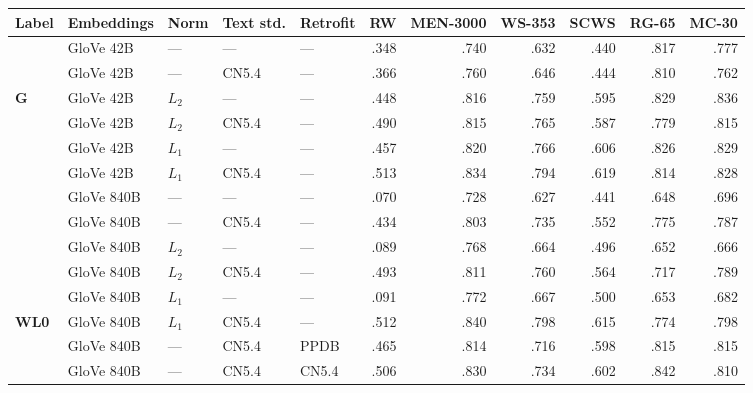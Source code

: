 \documentclass[letterpaper]{article}
\begin{document}
\begin{table*}[t]
\centering
\begin{tabular}{lllllrrrrrr}
\toprule
Label  &Embeddings   & Norm  & Text std. & Retrofit &       RW & MEN-3000 &    WS-353 &      SCWS &    RG-65 &    MC-30 \\
\midrule
       &GloVe 42B    & ---   & ---       & ---      &     .348 &     .740 &      .632 &      .440 &     .817 &     .777 \\
       &GloVe 42B    & ---   & CN5.4     & ---      &     .366 &     .760 &      .646 &      .444 &     .810 &     .762 \\
\bf G  &GloVe 42B    & $L_2$ & ---       & ---      &     .448 &     .816 &      .759 &      .595 &     .829 &     .836 \\
       &GloVe 42B    & $L_2$ & CN5.4     & ---      &     .490 &     .815 &      .765 &      .587 &     .779 &     .815 \\
       &GloVe 42B    & $L_1$ & ---       & ---      &     .457 &     .820 &      .766 &      .606 &     .826 &     .829 \\
       &GloVe 42B    & $L_1$ & CN5.4     & ---      &     .513 &     .834 &      .794 &      .619 &     .814 &     .828 \\
\midrule
       &GloVe 840B   & ---   & ---       & ---      &     .070 &     .728 &      .627 &      .441 &     .648 &     .696 \\
       &GloVe 840B   & ---   & CN5.4     & ---      &     .434 &     .803 &      .735 &      .552 &     .775 &     .787 \\
       &GloVe 840B   & $L_2$ & ---       & ---      &     .089 &     .768 &      .664 &      .496 &     .652 &     .666 \\
       &GloVe 840B   & $L_2$ & CN5.4     & ---      &     .493 &     .811 &      .760 &      .564 &     .717 &     .789 \\
       &GloVe 840B   & $L_1$ & ---       & ---      &     .091 &     .772 &      .667 &      .500 &     .653 &     .682 \\
\bf WL0&GloVe 840B   & $L_1$ & CN5.4     & ---      &     .512 &     .840 &      .798 &      .615 &     .774 &     .798 \\
\midrule
       &GloVe 840B   & ---   & CN5.4     & PPDB     &     .465 &     .814 &      .716 &      .598 &     .815 &     .815 \\
       &GloVe 840B   & ---   & CN5.4     & CN5.4    &     .506 &     .830 &      .734 &      .602 &     .842 &     .810 \\

\end{tabular}
\end{table*}
\end{document}
